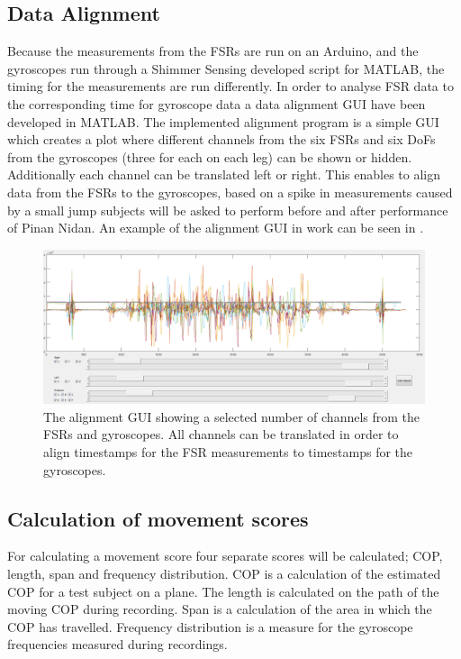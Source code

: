 \subsection{Data Alignment}
Because the measurements from the FSRs are run on an Arduino, and the gyroscopes run through a Shimmer Sensing developed script for MATLAB, the timing for the measurements are run differently. In order to analyse FSR data to the corresponding time for gyroscope data a data alignment GUI have been developed in MATLAB. The implemented alignment program is a simple GUI which creates a plot where different channels from the six FSRs and six DoFs from the gyroscopes (three for each on each leg) can be shown or hidden. Additionally each channel can be translated left or right. This enables to align data from the FSRs to the gyroscopes, based on a spike in measurements caused by a small jump subjects will be asked to perform before and after performance of Pinan Nidan. An example of the alignment GUI in work can be seen in .

\begin{figure}[H]
	\includegraphics[width=.6\textwidth]{figures/alignGUI}
	\caption{The alignment GUI showing a selected number of channels from the FSRs and gyroscopes. All channels can be translated in order to align timestamps for the FSR measurements to timestamps for the gyroscopes.}
	\label{fig:alignGUI}  %
\end{figure}


\subsection{Calculation of movement scores}

For calculating a movement score four separate scores will be calculated; COP, length, span and frequency distribution. COP is a calculation of the estimated COP for a test subject on a plane. The length is calculated on the path of the moving COP during recording. Span is a calculation of the area in which the COP has travelled. Frequency distribution is a measure for the gyroscope frequencies measured during recordings.

